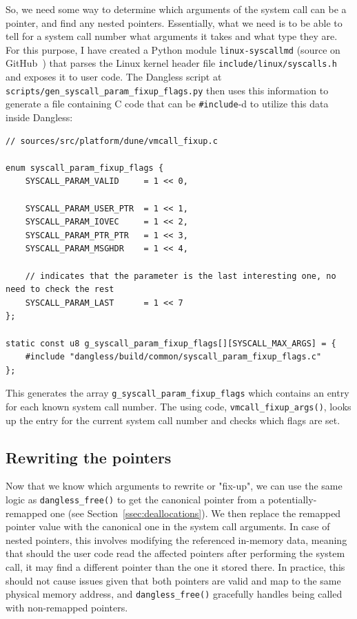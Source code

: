 So, we need some way to determine which arguments of the system call can be a pointer, and find any nested pointers. Essentially, what we need is to be able to tell for a system call number what arguments it takes and what type they are. For this purpose, I have created a Python module \texttt{linux-syscallmd} (source on GitHub~\cite{github-linux-syscallmd}) that parses the Linux kernel header file \texttt{include/linux/syscalls.h} and exposes it to user code. The Dangless script at \texttt{scripts/gen\_syscall\_param\_fixup\_flags.py} then uses this information to generate a file containing C code that can be \lstinline!#include!-d to utilize this data inside Dangless:

\begin{lstlisting}
// sources/src/platform/dune/vmcall_fixup.c

enum syscall_param_fixup_flags {
	SYSCALL_PARAM_VALID     = 1 << 0,
	
	SYSCALL_PARAM_USER_PTR  = 1 << 1,
	SYSCALL_PARAM_IOVEC     = 1 << 2,
	SYSCALL_PARAM_PTR_PTR   = 1 << 3,
	SYSCALL_PARAM_MSGHDR    = 1 << 4,
	
	// indicates that the parameter is the last interesting one, no need to check the rest
	SYSCALL_PARAM_LAST      = 1 << 7
};

static const u8 g_syscall_param_fixup_flags[][SYSCALL_MAX_ARGS] = {
	#include "dangless/build/common/syscall_param_fixup_flags.c"
};
\end{lstlisting}

This generates the array \lstinline!g_syscall_param_fixup_flags! which contains an entry for each known system call number. The using code, \lstinline!vmcall_fixup_args()!, looks up the entry for the current system call number and checks which flags are set. 


\subsection{Rewriting the pointers}

Now that we know which arguments to rewrite or "fix-up", we can use the same logic as \lstinline!dangless_free()! to get the canonical pointer from a potentially-remapped one (see Section~\ref{ssec:deallocations}). We then replace the remapped pointer value with the canonical one in the system call arguments.
In case of nested pointers, this involves modifying the referenced in-memory data, meaning that should the user code read the affected pointers after performing the system call, it may find a different pointer than the one it stored there. In practice, this should not cause issues given that both pointers are valid and map to the same physical memory address, and \lstinline!dangless_free()! gracefully handles being called with non-remapped pointers.


